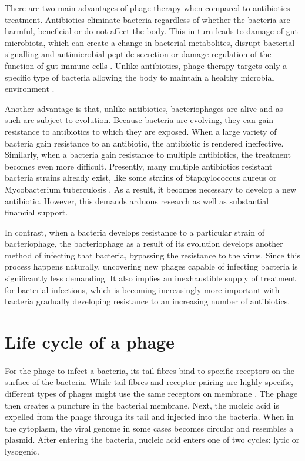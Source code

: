 There are two main advantages of phage therapy \cite{lin2017phage} when compared to antibiotics treatment. Antibiotics eliminate bacteria regardless of whether the bacteria are harmful, beneficial or do not affect the body. This in turn leads to damage of gut microbiota, which can create a change in bacterial metabolites, disrupt bacterial signalling and antimicrobial peptide secretion or damage regulation of the function of gut immune cells \cite{zhang2019facing}. Unlike antibiotics, phage therapy targets only a specific type of bacteria allowing the body to maintain a healthy microbial environment \cite{lin2017phage}. 

Another advantage is that, unlike antibiotics, bacteriophages are alive and as such are subject to evolution. Because bacteria are evolving, they can gain resistance to antibiotics to which they are exposed. When a large variety of bacteria gain resistance to an antibiotic, the antibiotic is rendered ineffective. Similarly, when a bacteria gain resistance to multiple antibiotics, the treatment becomes even more difficult. Presently, many multiple antibiotics resistant bacteria strains already exist, like some strains of Staphylococcus aureus or Mycobacterium tuberculosis \cite{guilfoile2007antibiotic}. As a result, it becomes necessary to develop a new antibiotic. However, this demands arduous research as well as substantial financial support. 

In contrast, when a bacteria develops resistance to a particular strain of bacteriophage, the bacteriophage as a result of its evolution develops another method of infecting that bacteria, bypassing the resistance to the virus. Since this process happens naturally, uncovering new phages capable of infecting bacteria is significantly less demanding. It also implies an inexhaustible supply of treatment for bacterial infections, which is becoming increasingly more important with bacteria gradually developing resistance to an increasing number of antibiotics.

\section{Life cycle of a phage}
\paragraph*{}
For the phage to infect a bacteria, its tail fibres bind to specific receptors on the surface of the bacteria. While tail fibres and receptor pairing are highly specific, different types of phages might use the same receptors on membrane \cite{guttman2005basic}. The phage then creates a puncture in the bacterial membrane. Next, the nucleic acid is expelled from the phage through its tail and injected into the bacteria. When in the cytoplasm, the viral genome in some cases becomes circular and resembles a plasmid. After entering the bacteria, nucleic acid enters one of two cycles: lytic or lysogenic.

